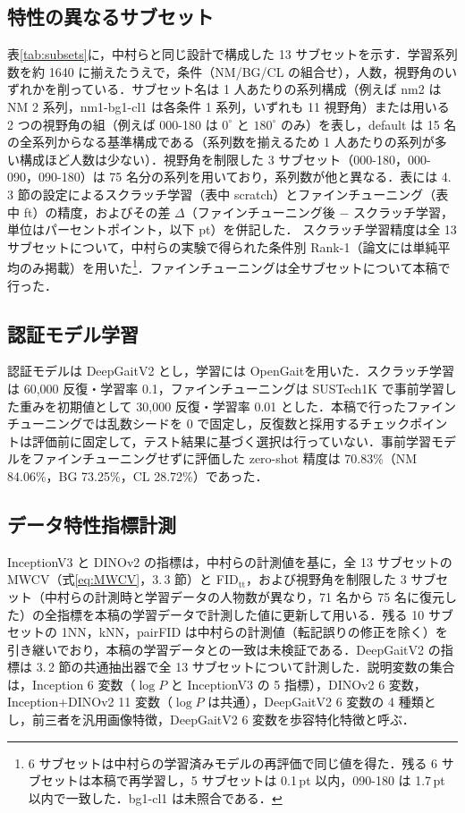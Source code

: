 \documentclass[technicalreport]{ieicej}
\begin{document}
\subsection{特性の異なるサブセット}
表\ref{tab:subsets}に，中村ら\cite{Nakamura_IEICE}と同じ設計で構成した 13 サブセットを示す．学習系列数を約 1640 に揃えたうえで，条件（NM/BG/CL の組合せ），人数，視野角のいずれかを削っている．サブセット名は 1 人あたりの系列構成（例えば nm2 は NM 2 系列，nm1-bg1-cl1 は各条件 1 系列，いずれも 11 視野角）または用いる 2 つの視野角の組（例えば 000-180 は $0^\circ$ と $180^\circ$ のみ）を表し，default は 15 名の全系列からなる基準構成である（系列数を揃えるため 1 人あたりの系列が多い構成ほど人数は少ない）．視野角を制限した 3 サブセット（000-180，000-090，090-180）は 75 名分の系列を用いており，系列数が他と異なる．表には 4.\,3 節の設定によるスクラッチ学習（表中 scratch）とファインチューニング（表中 ft）の精度，およびその差 $\Delta$（ファインチューニング後 $-$ スクラッチ学習，単位はパーセントポイント，以下 pt）を併記した．
スクラッチ学習精度は全 13 サブセットについて，中村らの実験で得られた条件別 Rank-1（論文には単純平均のみ掲載）を用いた\footnote{6 サブセットは中村らの学習済みモデルの再評価で同じ値を得た．残る 6 サブセットは本稿で再学習し，5 サブセットは 0.1\,pt 以内，090-180 は 1.7\,pt 以内で一致した．bg1-cl1 は未照合である．}．ファインチューニングは全サブセットについて本稿で行った．

\subsection{認証モデル学習}
認証モデルは DeepGaitV2 とし，学習には OpenGait\cite{Fan_OpenGait}を用いた．スクラッチ学習は 60,000 反復・学習率 0.1，ファインチューニングは SUSTech1K で事前学習した重みを初期値として 30,000 反復・学習率 0.01 とした．本稿で行ったファインチューニングでは乱数シードを 0 で固定し，反復数と採用するチェックポイントは評価前に固定して，テスト結果に基づく選択は行っていない．事前学習モデルをファインチューニングせずに評価した zero-shot 精度は 70.83\%（NM 84.06\%，BG 73.25\%，CL 28.72\%）であった．

\subsection{データ特性指標計測}
InceptionV3 と DINOv2 の指標は，中村らの計測値を基に，全 13 サブセットの MWCV（式\eqref{eq:MWCV}，3.\,3 節）と FID$_{\mathrm{tt}}$，および視野角を制限した 3 サブセット（中村らの計測時と学習データの人物数が異なり，71 名から 75 名に復元した）の全指標を本稿の学習データで計測した値に更新して用いる．残る 10 サブセットの 1NN，kNN，pairFID は中村らの計測値（転記誤りの修正を除く）を引き継いでおり，本稿の学習データとの一致は未検証である．DeepGaitV2 の指標は 3.\,2 節の共通抽出器で全 13 サブセットについて計測した．説明変数の集合は，Inception 6 変数（$\log P$ と InceptionV3 の 5 指標），DINOv2 6 変数，Inception+DINOv2 11 変数（$\log P$ は共通），DeepGaitV2 6 変数の 4 種類とし，前三者を汎用画像特徴，DeepGaitV2 6 変数を歩容特化特徴と呼ぶ．
\end{document}
